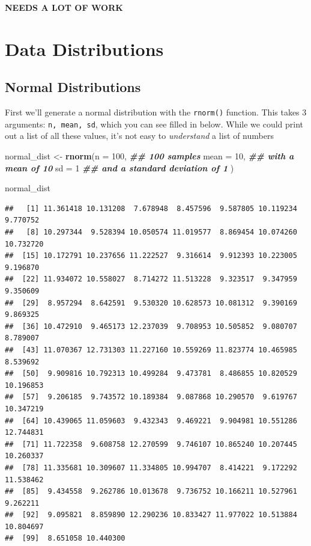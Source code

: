 \documentclass[
]{book}
\newenvironment{Shaded}{\begin{snugshade}}{\end{snugshade}}
\newcommand{\AttributeTok}[1]{\textcolor[rgb]{0.13,0.29,0.53}{#1}}
\newcommand{\DecValTok}[1]{\textcolor[rgb]{0.00,0.00,0.81}{#1}}
\newcommand{\DocumentationTok}[1]{\textcolor[rgb]{0.56,0.35,0.01}{\textbf{\textit{#1}}}}
\newcommand{\FunctionTok}[1]{\textcolor[rgb]{0.13,0.29,0.53}{\textbf{#1}}}
\newcommand{\NormalTok}[1]{#1}
\newcommand{\OtherTok}[1]{\textcolor[rgb]{0.56,0.35,0.01}{#1}}
\begin{document}
\textbf{NEEDS A LOT OF WORK}

\hypertarget{data-distributions}{%
\section{Data Distributions}\label{data-distributions}}

\hypertarget{normal-distributions}{%
\subsection{Normal Distributions}\label{normal-distributions}}

First we'll generate a normal distribution with the \texttt{rnorm()} function. This takes 3 arguments: \texttt{n,\ mean,\ sd}, which you can see filled in below. While we could print out a list of all these values, it's not easy to \emph{understand} a list of numbers

\begin{Shaded}
\begin{Highlighting}[]
\NormalTok{normal\_dist }\OtherTok{\textless{}{-}} \FunctionTok{rnorm}\NormalTok{(}\AttributeTok{n =} \DecValTok{100}\NormalTok{, }\DocumentationTok{\#\# 100 samples}
                     \AttributeTok{mean =} \DecValTok{10}\NormalTok{, }\DocumentationTok{\#\# with a mean of 10}
                     \AttributeTok{sd =} \DecValTok{1} \DocumentationTok{\#\# and a standard deviation of 1}
\NormalTok{                     )}


\NormalTok{normal\_dist}
\end{Highlighting}
\end{Shaded}

\begin{verbatim}
##   [1] 11.361418 10.131208  7.678948  8.457596  9.587805 10.119234  9.770752
##   [8] 10.297344  9.528394 10.050574 11.019577  8.869454 10.074260 10.732720
##  [15] 10.172791 10.237656 11.222527  9.316614  9.912393 10.223005  9.196870
##  [22] 11.934072 10.558027  8.714272 11.513228  9.323517  9.347959  9.350609
##  [29]  8.957294  8.642591  9.530320 10.628573 10.081312  9.390169  9.869325
##  [36] 10.472910  9.465173 12.237039  9.708953 10.505852  9.080707  8.789007
##  [43] 11.070367 12.731303 11.227160 10.559269 11.823774 10.465985  8.539692
##  [50]  9.909816 10.792313 10.499284  9.473781  8.486855 10.820529 10.196853
##  [57]  9.206185  9.743572 10.189384  9.087868 10.290570  9.619767 10.347219
##  [64] 10.439065 11.059603  9.432343  9.469221  9.904981 10.551286 12.744831
##  [71] 11.722358  9.608758 12.270599  9.746107 10.865240 10.207445 10.260337
##  [78] 11.335681 10.309607 11.334805 10.994707  8.414221  9.172292 11.538462
##  [85]  9.434558  9.262786 10.013678  9.736752 10.166211 10.527961  9.262211
##  [92]  9.095821  8.859890 12.290236 10.833427 11.977022 10.513884 10.804697
##  [99]  8.651058 10.440300
\end{verbatim}
\end{document}
